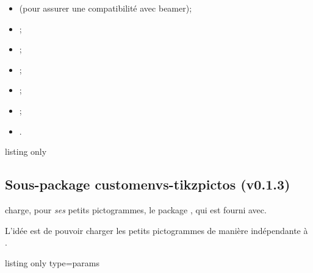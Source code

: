 \documentclass[french,11pt,a4paper]{article}
\begin{document}
\begin{itemize}
	\item {} (pour assurer une compatibilité avec \textsf{beamer});
	\item {} ;
	\item {} ;
	\item {} ;
	\item {} ;
	\item {} ;
	\item {}.
\end{itemize}

\begin{DemoCode}{listing only}
\usepackage{customenvs}

\usepackage[option(s)]{customenvs}
\end{DemoCode}

\subsection{Sous-package customenvs-tikzpictos (v0.1.3)}

 charge, pour \textit{ses} petits pictogrammes, le package , qui est fourni avec.

L'idée est de pouvoir charger les petits pictogrammes de manière indépendante à .

\begin{DemoCode}{listing only}
	{type=params}

\end{DemoCode}
\end{document}
